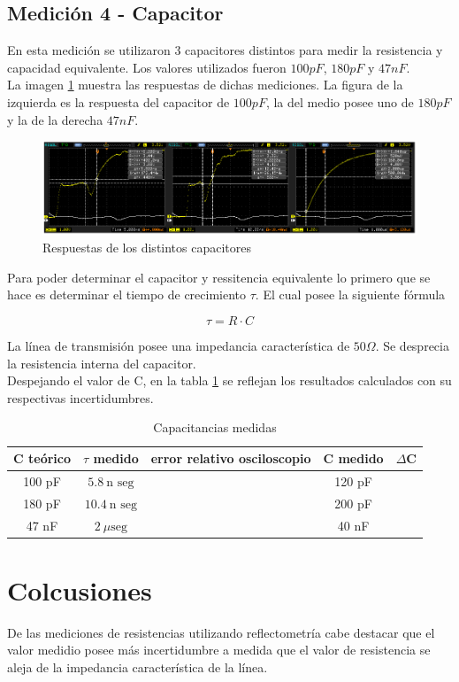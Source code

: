 \documentclass[a4paper,10pt]{article}
\begin{document}
	\subsection{Medición 4 - Capacitor}
	\indent En esta medición se utilizaron 3 capacitores distintos para medir
	la resistencia y capacidad equivalente. Los valores utilizados fueron 
	$100pF$, $180pF$ y $47nF$. \\
	\indent La imagen \ref{img010} muestra las respuestas de dichas 
	mediciones. La figura de la izquierda es la respuesta del capacitor de 
	$100pF$, la del medio posee uno de $180pF$ y la de la derecha $47nF$. \\
	
		\begin{figure}[!htb]
			\centering
			\includegraphics[width=12cm]
			{Imagenes/CurvasCapacitor.png}
			\caption{Respuestas de los distintos capacitores}
			\label{img010} 
		\end{figure}

	\indent Para poder determinar el capacitor y ressitencia equivalente lo 
	primero que se hace es determinar el tiempo de crecimiento $\tau$. El cual
	posee la siguiente fórmula

		\begin{equation}
			\tau = R\cdot C
		\end{equation}
	
	\indent La línea de transmisión posee una impedancia característica de 
	$50\Omega$. Se desprecia la resistencia interna del capacitor. \\
	\indent Despejando el valor de C, en la tabla \ref{tab002} se reflejan los 
	resultados calculados con su respectivas incertidumbres. \\

		\begin{table}[!htp]
			\centering
			\begin{tabular}{|c|c|c|c|c|}
				\hline
    			C teórico & $\tau$ medido & error relativo osciloscopio & C 
				medido &
				$\Delta$C \\
				\hline
				100 pF & $5.8~\text{n seg}$ &  & 120 pF & \\
				\hline 
				180 pF & $10.4~\text{n seg}$ & & 200 pF & \\
				\hline
				47 nF & $2~\mu\text{seg}$ & & 40 nF & \\
				\hline
			\end{tabular}
			\caption{Capacitancias medidas} 
			\label{tab002} %
		\end{table}

	\newpage
	\section{Colcusiones}
	\indent De las mediciones de resistencias utilizando reflectometría cabe 
	destacar que el valor medidio posee más incertidumbre a medida que el 
	valor de resistencia se aleja de la impedancia característica de la línea.
\end{document}
